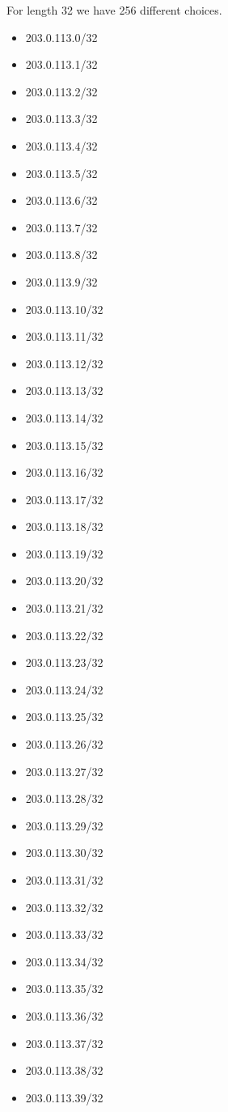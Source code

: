 \documentclass[a4paper,10pt]{article}
\begin{document}
For length 32 we have 256 different choices.
\begin{itemize}
  \item 203.0.113.0/32
  \item 203.0.113.1/32
  \item 203.0.113.2/32
  \item 203.0.113.3/32
  \item 203.0.113.4/32
  \item 203.0.113.5/32
  \item 203.0.113.6/32
  \item 203.0.113.7/32
  \item 203.0.113.8/32
  \item 203.0.113.9/32
  \item 203.0.113.10/32
  \item 203.0.113.11/32
  \item 203.0.113.12/32
  \item 203.0.113.13/32
  \item 203.0.113.14/32
  \item 203.0.113.15/32
  \item 203.0.113.16/32
  \item 203.0.113.17/32
  \item 203.0.113.18/32
  \item 203.0.113.19/32
  \item 203.0.113.20/32
  \item 203.0.113.21/32
  \item 203.0.113.22/32
  \item 203.0.113.23/32
  \item 203.0.113.24/32
  \item 203.0.113.25/32
  \item 203.0.113.26/32
  \item 203.0.113.27/32
  \item 203.0.113.28/32
  \item 203.0.113.29/32
  \item 203.0.113.30/32
  \item 203.0.113.31/32
  \item 203.0.113.32/32
  \item 203.0.113.33/32
  \item 203.0.113.34/32
  \item 203.0.113.35/32
  \item 203.0.113.36/32
  \item 203.0.113.37/32
  \item 203.0.113.38/32
  \item 203.0.113.39/32

\end{itemize}
\end{document}
